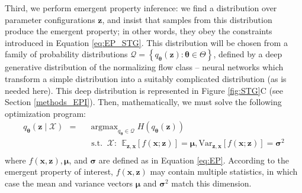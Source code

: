 \documentclass[11pt]{article}
\DeclareMathOperator*{\argmax}{argmax}
\begin{document}
Third, we perform emergent property inference: we find a distribution over parameter configurations $\mathbf{z}$, and insist that samples from this distribution produce the emergent property; in other words, they obey the constraints introduced in Equation \ref{eq:EP_STG}.  
This distribution will be chosen from a family of probability distributions $\mathcal{Q} = \left\{ q_{\bm{\theta}}(\mathbf{z}) : \bm{\theta} \in \Theta \right\}$, defined by a deep generative distribution of the normalizing flow class \cite{rezende2015variational, dinh2017density, papamakarios2017masked} -- neural networks which transform a simple distribution into a suitably complicated distribution (as is needed here).  
This deep distribution is represented in Figure \ref{fig:STG}C (see Section \ref{methods_EPI}).  
Then, mathematically, we must solve the following optimization program: 
\begin{equation} \label{eq:EPI}
\begin{split}
q_{\bm{\theta}}(\mathbf{z} \mid \mathcal{X}) ~~=~~ &\argmax_{q_{\bm{\theta}} \in \mathcal{Q}} H(q_{\bm{\theta}}(\mathbf{z})) \\
&\text{  s.t.  } ~\mathcal{X}:~~ \mathbb{E}_{\mathbf{z},\mathbf{x}}\left[f(\mathbf{x}; \mathbf{z})\right] = \bm{\mu}, \text{Var}_{\mathbf{z},\mathbf{x}}\left[f(\mathbf{x}; \mathbf{z})\right] = \bm{\sigma}^2 \\
\end{split}
\end{equation}
where $f(\mathbf{x}, \mathbf{z}), \bm{\mu}$, and $\bm{\sigma}$ are defined as in Equation \ref{eq:EP}.
According to the emergent property of interest, $f(\mathbf{x}, \mathbf{z})$ may contain multiple statistics, in which case the mean and variance vectors $\bm{\mu}$ and $\bm{\sigma}^2$ match this dimension.
\end{document}
